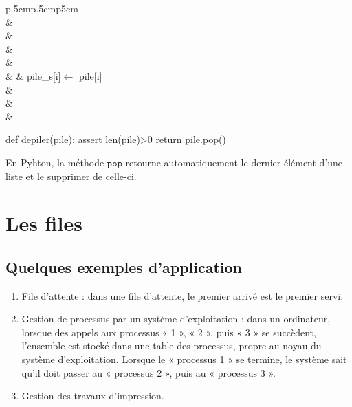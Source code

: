 \documentclass[10pt,fleqn]{article} %
\begin{document}
\noindent \begin{minipage}[c]{.48\linewidth}
\begin{pseudo}
\begin{tabular}{p{.5cm}p{.5cm}p{5cm}}
\hline
{}  \\
& \\
& \\
& \\
& \\
& & pile\_s[i]$\leftarrow$ pile[i]\\
& \\
& \\
& \\

\hline
\end{tabular}
\end{pseudo}
\end{minipage}\hfill
\begin{minipage}[c]{.48\linewidth}
\begin{py}
\begin{python}
def depiler(pile):
    assert len(pile)>0
    return pile.pop()
\end{python}
\end{py}
\end{minipage}
\begin{rem}
En Pyhton, la méthode $\texttt{pop}$ retourne automatiquement le dernier élément d'une liste et le supprimer de celle-ci.
\end{rem}

\section{Les files}
\subsection{Quelques exemples d'application}

\begin{enumerate}
\item File d’attente : dans une file d’attente, le premier arrivé est le premier servi.
\item Gestion de processus par un système d’exploitation : dans un ordinateur, lorsque des appels aux processus « 1 », « 2 », puis « 3 » se succèdent, l’ensemble est stocké dans une table des processus, propre au noyau du système d’exploitation. Lorsque le « processus 1 » se termine, le système sait qu’il doit passer au « processus 2 », puis au « processus 3 ».
\item Gestion des travaux d'impression.
\end{enumerate}
\end{document}
